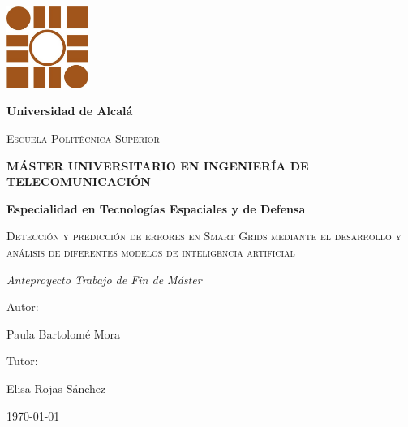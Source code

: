 \begin{titlepage}
\centering
{\includegraphics[width=0.2\textwidth]{./img/logo}\par}
\vspace{0.5cm}
{\bfseries\LARGE Universidad de Alcalá  \par}
\vspace{0.4cm}
{\scshape\Large Escuela Politécnica Superior \par}
\vspace{1.2cm}
{\bfseries\Large MÁSTER UNIVERSITARIO EN INGENIERÍA DE  TELECOMUNICACIÓN  \par}
\vspace{0.3cm}
{\bfseries\Large Especialidad en Tecnologías Espaciales y de Defensa  \par}
\vspace{2.6cm}
{\scshape\Huge Detección y predicción de errores en Smart Grids mediante el desarrollo y análisis de diferentes modelos de inteligencia artificial\par}
\vspace{1.8cm}
{\itshape\Large Anteproyecto Trabajo de Fin de Máster \par}
\vfill
{\Large Autor: \par}
{\Large Paula Bartolomé Mora \par}
\vfill
{\Large Tutor: \par}
{\Large Elisa Rojas Sánchez \par}
\vfill
{\Large \today \par}
\end{titlepage}